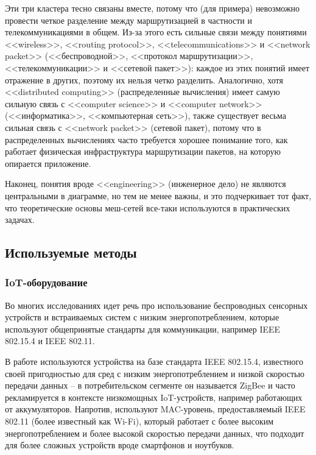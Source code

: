 \documentclass[%
]{report}
\begin{document}
Эти три кластера тесно связаны вместе,
потому что (для примера)
невозможно провести четкое разделение между
маршрутизацией в частности и телекоммуникациями в общем.
Из-за этого есть сильные связи между понятиями
<<wireless>>, <<routing protocol>>, <<telecommunications>> и
<<network packet>> (<<беспроводной>>, <<протокол маршрутизации>>, <<телекоммуникации>>
и <<сетевой пакет>>):
каждое из этих понятий имеет отражение в других,
поэтому их нельзя четко разделить.
Аналогично, хотя
<<distributed computing>> (распределенные вычисления)
имеет самую сильную связь с <<computer
science>> и <<computer network>> (<<информатика>>, <<компьютерная сеть>>),
также существует весьма сильная связь с 
<<network packet>> (сетевой пакет),
потому что в распределенных вычислениях
часто требуется хорошее понимание того,
как работает физическая инфраструктура маршрутизации пакетов,
на которую опирается приложение.

Наконец, понятия вроде  <<engineering>> (инженерное дело)
не являются центральными в диаграмме,
но тем не менее важны,
и это подчеркивает тот факт, 
что теоретические основы меш-сетей
все-таки используются в практических задачах.


\subsection{Используемые методы}\label{methodology-details}

\subsubsection{IoT-оборудование}\label{iot-hardware}

Во многих исследованиях идет речь про использование
беспроводных сенсорных устройств
и встраиваемых систем с низким энергопотреблением,
которые используют общепринятые стандарты для коммуникации,
например IEEE 802.15.4 и IEEE 802.11.

В работе \textcite{KRENTZ202457}
используются устройства на базе стандарта IEEE 802.15.4,
известного своей пригодностью для
сред с низким энергопотреблением и низкой
скоростью передачи данных -- в потребительском сегменте
он называется ZigBee и часто рекламируется
в контексте низкомощных IoT-устройств,
например работающих от аккумуляторов.
Напротив, \textcite{SAIF2015404,KABIWA20131108}
используют MAC-уровень,
предоставляемый IEEE 802.11 (более известный как Wi-Fi),
который работает с более высоким энергопотреблением
и более высокой скоростью передачи данных,
что подходит для более сложных устройств
вроде смартфонов и ноутбуков.
\end{document}
